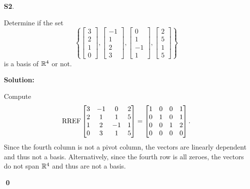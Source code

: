 \documentclass{article}
\newenvironment{problem}[1]
{
	\begin{flushleft}
	\textbf{#1}.
	\ignorespaces
}
{
	\end{flushleft}
}
\newenvironment{solution}
{
	\ignorespaces
	\textbf{Solution:}
}
{
	\ignorespacesafterend
	\begin{flushright}
	{\bfseries \qed}
	\end{flushright}
}
\begin{document}
\begin{problem}{S2}
Determine if the set \[ \left\{
 \begin{bmatrix} 3 \\ 2 \\ 1 \\ 0 \end{bmatrix} ,
 \begin{bmatrix} -1 \\ 1 \\ 2 \\ 3 \end{bmatrix} ,
 \begin{bmatrix} 0 \\ 1 \\ -1 \\ 1 \end{bmatrix} ,
 \begin{bmatrix} 2 \\ 5 \\ 1 \\ 5 \end{bmatrix} \right\} \] 
is a basis of $\mathbb{R}^4$ or not.
\end{problem}
\begin{solution}
Compute 
\[\operatorname{RREF} \begin{bmatrix} 3 & -1 & 0 & 2 \\ 2 & 1 & 1 & 5 \\ 1 & 2 & -1 & 1 \\ 0 & 3 & 1 & 5 \end{bmatrix} = 
\begin{bmatrix} 1 & 0 & 0 & 1 \\ 0 & 1 & 0 & 1 \\ 0 & 0 & 1 & 2 \\ 0 & 0 & 0 & 0 \end{bmatrix}.\]
Since the fourth column is not a pivot column, the vectors are linearly dependent and thus not a basis.  Alternatively, since the fourth row is all zeroes, the vectors do not span $\mathbb{R}^4$ and thus are not a basis.
\end{solution}
\end{document}
